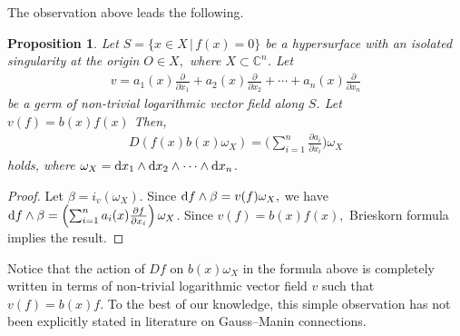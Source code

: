 \documentclass[pdftex]{sigma}%
\numberwithin{equation}{section}
\newtheorem{Proposition}[Theorem]{Proposition}
 { \theoremstyle{definition}
\newtheorem{Definition}[Theorem]{Definition}
\newtheorem{Remark}[Theorem]{Remark}
\newtheorem{Example}[Theorem]{Example}
 }
\begin{document}
The observation above leads the following.

\begin{Proposition}\label{pro5}
Let $ S=\{x \in X \,|\, f(x)=0 \} $ be a hypersurface with an isolated singularity at the origin $O \in X, $ where $ X \subset {\mathbb C}^n$. Let
\begin{gather*}
v=a_1(x)\frac{\partial}{\partial x_1} + a_2(x)\frac{\partial}{\partial x_2}+ \cdots +a_n(x)\frac{\partial}{\partial x_n}
\end{gather*}
be a germ of non-trivial logarithmic vector field along $S$.
 Let
$ v(f) = b(x)f(x) $
Then,
\begin{gather*}
D(f(x)b(x)\omega_X) = \Bigg( \sum_{i=1}^{n} \frac{\partial a_i}{\partial x_i} \Bigg) \omega_X
\end{gather*}
holds, where $ \omega_X={\rm d}x_1 \wedge {\rm d}x_2 \wedge \cdots \wedge {\rm d}x_n$.
\end{Proposition}
\begin{proof}
Let $ \beta=i_v(\omega_X)$.
Since $ {\rm d}f\wedge \beta = v(f) \omega_X, $ we have $ {\rm d}f\wedge \beta = \left( \sum_{i=1}^{n} a_i(x)\frac{\partial f}{\partial x_i} \right)\omega_X$. Since $ v(f) =b(x)f(x), $ Brieskorn formula implies the result.
\end{proof}


Notice that the action of $Df $ on $ b(x)\omega_X $ in the formula above is completely written in terms of non-trivial logarithmic vector field
$v$ such that $ v(f)=b(x)f$.
To the best of our knowledge, this simple observation has not been explicitly stated in literature on Gauss--Manin connections.


\end{document}
